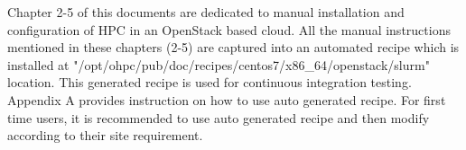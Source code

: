 
Chapter 2-5 of this documents are dedicated to manual installation and configuration of HPC in an OpenStack based cloud. All the manual instructions mentioned in these chapters (2-5) are captured into an automated recipe which is installed at "/opt/ohpc/pub/doc/recipes/centos7/x86\_64/openstack/slurm" location. This generated recipe is used for continuous integration testing. 
Appendix A provides instruction on how to use auto generated recipe. For first time users, it is recommended to use auto generated recipe and then modify according to their site requirement.

